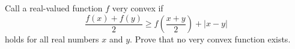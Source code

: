 Call a real-valued function $ f$ very convex if\[ \frac {f(x) + f(y)}{2} \ge f\left(\frac {x + y}{2}\right) + |x - y| \]
holds for all real numbers $ x$ and $ y$. Prove that no very convex function exists.
